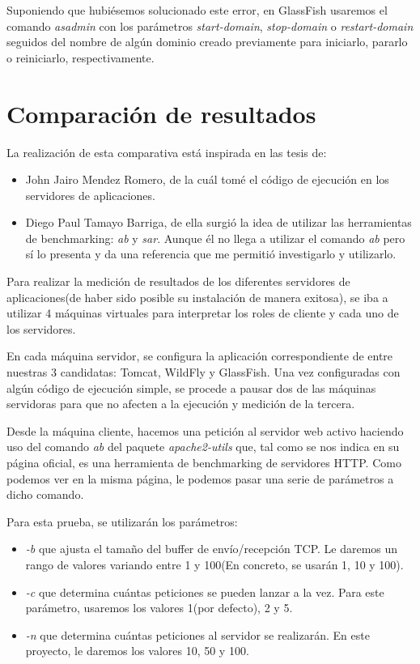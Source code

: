 \documentclass[a4paper, 10pt]{article}
\begin{document}
		Suponiendo que hubiésemos solucionado este error, en GlassFish usaremos el comando
		\textit{asadmin} con los parámetros \textit{start-domain}, \textit{stop-domain} o
		\textit{restart-domain} seguidos del nombre de algún dominio creado previamente
		para iniciarlo, pararlo o reiniciarlo, respectivamente.

\section{Comparación de resultados}
	La realización de esta comparativa está inspirada en las tesis de:
		\begin{itemize}
			\item John Jairo Mendez Romero\cite{JJMR_Tesis}, de la cuál tomé el código de
			ejecución en los servidores de aplicaciones.
			
			\item Diego Paul Tamayo Barriga\cite{DPTB_Tesis}, de ella surgió la idea de utilizar
			las herramientas de benchmarking: \textit{ab} y \textit{sar}. Aunque él no llega a
			utilizar el comando \textit{ab} pero sí lo presenta y da una referencia que me
			permitió investigarlo y utilizarlo.
		\end{itemize}

	Para realizar la medición de resultados de los diferentes servidores de aplicaciones(de haber
	sido posible su instalación de manera exitosa), se iba a utilizar 4 máquinas virtuales para
	interpretar los roles de cliente y cada uno de los servidores.
	
	En cada máquina servidor, se configura la aplicación correspondiente de entre nuestras 3 
	candidatas: Tomcat, WildFly y GlassFish. Una vez configuradas con algún código de ejecución
	simple, se procede a pausar dos de las máquinas servidoras para que no afecten a la ejecución
	y medición de la tercera.
	
	Desde la máquina cliente, hacemos una petición al servidor web activo haciendo uso del comando
	\textit{ab} del paquete \textit{apache2-utils} que, tal como se nos indica en su página
	oficial\cite{AB_official}, es una herramienta de benchmarking de servidores HTTP. Como podemos
	 ver en la misma página, le podemos pasar una serie de parámetros a dicho comando.
	
	Para esta prueba, se utilizarán los parámetros:
	\begin{itemize}
		\item \textit{-b} que ajusta el tamaño del buffer de envío/recepción TCP. Le daremos un rango
		de valores variando entre 1 y 100(En concreto, se usarán 1, 10 y 100).
		\item \textit{-c} que determina cuántas peticiones se pueden lanzar a la vez. Para este parámetro,
		usaremos los valores 1(por defecto), 2 y 5.
		\item \textit{-n} que determina cuántas peticiones al servidor se realizarán. En este proyecto,
		le daremos los valores 10, 50 y 100.
	\end{itemize}
	
\end{document}
